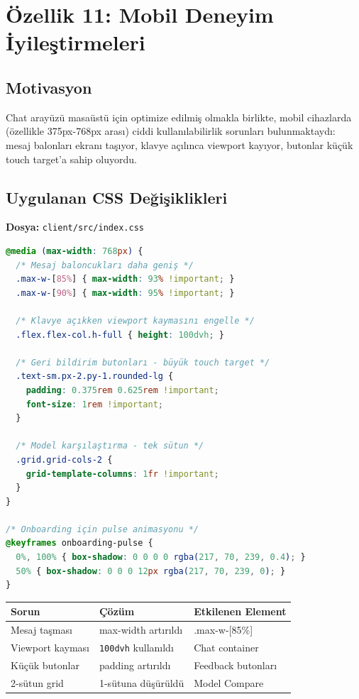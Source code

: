 \documentclass[12pt,a4paper]{article}
\begin{document}
\newpage

\section{Özellik 11: Mobil Deneyim İyileştirmeleri}

\subsection{Motivasyon}
Chat arayüzü masaüstü için optimize edilmiş olmakla birlikte, mobil cihazlarda (özellikle 375px-768px arası) ciddi kullanılabilirlik sorunları bulunmaktaydı: mesaj balonları ekranı taşıyor, klavye açılınca viewport kayıyor, butonlar küçük touch target'a sahip oluyordu.

\subsection{Uygulanan CSS Değişiklikleri}

\textbf{Dosya:} \texttt{client/src/index.css}

\begin{lstlisting}[language=CSS, caption={Mobil chat iyileştirmeleri}]
@media (max-width: 768px) {
  /* Mesaj baloncukları daha geniş */
  .max-w-[85%] { max-width: 93% !important; }
  .max-w-[90%] { max-width: 95% !important; }

  /* Klavye açıkken viewport kaymasını engelle */
  .flex.flex-col.h-full { height: 100dvh; }

  /* Geri bildirim butonları - büyük touch target */
  .text-sm.px-2.py-1.rounded-lg {
    padding: 0.375rem 0.625rem !important;
    font-size: 1rem !important;
  }

  /* Model karşılaştırma - tek sütun */
  .grid.grid-cols-2 {
    grid-template-columns: 1fr !important;
  }
}

/* Onboarding için pulse animasyonu */
@keyframes onboarding-pulse {
  0%, 100% { box-shadow: 0 0 0 0 rgba(217, 70, 239, 0.4); }
  50% { box-shadow: 0 0 0 12px rgba(217, 70, 239, 0); }
}
\end{lstlisting}

\begin{tabular}{lll}
\toprule
\textbf{Sorun} & \textbf{Çözüm} & \textbf{Etkilenen Element} \\
\midrule
Mesaj taşması & max-width artırıldı & .max-w-{[}85\%{]} \\
Viewport kayması & \texttt{100dvh} kullanıldı & Chat container \\
Küçük butonlar & padding artırıldı & Feedback butonları \\
2-sütun grid & 1-sütuna düşürüldü & Model Compare \\
\bottomrule
\end{tabular}
\end{document}
